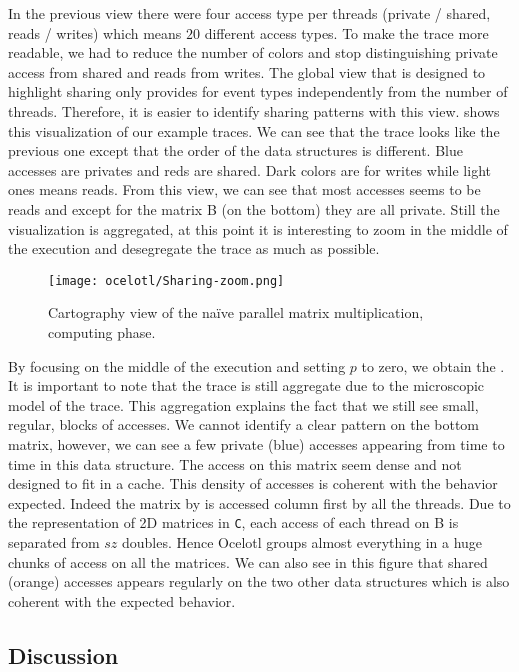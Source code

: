In the previous view there were four access type per threads (private / shared, reads / writes) which means $20$ different access types.
To make the trace more readable, we had to reduce the number of colors and stop distinguishing private access from shared and reads from writes.
The global view that is designed to highlight sharing only provides for event types independently from the number of threads.
Therefore, it is easier to identify sharing patterns with this view.
 shows this visualization of our example traces.
We can see that the trace looks like the previous one except that the order of the data structures is different.
Blue accesses are privates and reds are shared.
Dark colors are for writes while light ones means reads.
From this view, we can see that most accesses seems to be reads and except for the matrix B (on the bottom) they are all private.
Still the visualization is aggregated, at this point it is interesting to zoom in the middle of the execution and desegregate the trace as much as possible.

\begin{figure}[htb]
    \centering
    \texttt{[image: ocelotl/Sharing-zoom.png]}
    \caption{Cartography view of the naïve parallel matrix multiplication, computing phase.}
    \label{fig:ocelotl-Carto-zoom}
\end{figure}

By focusing on the middle of the execution and setting $p$ to zero, we obtain the .
It is important to note that the trace is still aggregate due to the microscopic model of the trace.
This aggregation explains the fact that we still see small, regular, blocks of accesses.
We cannot identify a clear pattern on the bottom matrix, however, we can see a few private (blue) accesses appearing from time to time in this data structure.
The access on this matrix seem dense and not designed to fit in a cache.
This density of accesses is coherent with the behavior expected.
Indeed the matrix by is accessed column first by all the threads.
Due to the representation of 2D matrices in \texttt{C}, each access of each thread on B is separated from $sz$ doubles.
Hence \gls{Ocelotl} groups almost everything in a huge chunks of access on all the matrices.
We can also see in this figure that shared (orange) accesses appears regularly on the two other data structures which is also coherent with the expected behavior.

\subsection{Discussion}


